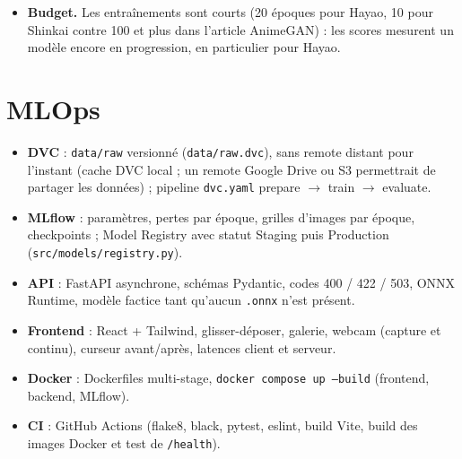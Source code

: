 \documentclass[11pt,a4paper]{article}
\begin{document}
\begin{itemize}
        baisse régulièrement (0,54 à 0,23) tandis que celle du générateur remonte légèrement :
        le discriminateur gagne la partie, signe qu'il faudrait plus d'époques ou un poids
        adverse plus fort pour que le générateur s'éloigne de la photo. Aucune divergence n'a
        été observée, ce qui est cohérent avec le rôle stabilisateur de la normalisation
        spectrale (non testée sans elle, faute de budget GPU).
  \item \textbf{Budget.} Les entraînements sont courts (20 époques pour Hayao, 10 pour
        Shinkai contre 100 et plus dans l'article AnimeGAN) : les scores mesurent un modèle
        encore en progression, en particulier pour Hayao.
\end{itemize}

\section{MLOps}
\begin{itemize}
  \item \textbf{DVC} : \texttt{data/raw} versionné (\texttt{data/raw.dvc}), sans remote
        distant pour l'instant (cache DVC local ; un remote Google Drive ou S3 permettrait de
        partager les données) ; pipeline \texttt{dvc.yaml} prepare $\rightarrow$ train
        $\rightarrow$ evaluate.
  \item \textbf{MLflow} : paramètres, pertes par époque, grilles d'images par époque,
        checkpoints ; Model Registry avec statut Staging puis Production
        (\texttt{src/models/registry.py}).
  \item \textbf{API} : FastAPI asynchrone, schémas Pydantic, codes 400 / 422 / 503, ONNX
        Runtime, modèle factice tant qu'aucun \texttt{.onnx} n'est présent.
  \item \textbf{Frontend} : React + Tailwind, glisser-déposer, galerie, webcam (capture et
        continu), curseur avant/après, latences client et serveur.
  \item \textbf{Docker} : Dockerfiles multi-stage, \texttt{docker compose up --build}
        (frontend, backend, MLflow).
  \item \textbf{CI} : GitHub Actions (flake8, black, pytest, eslint, build Vite, build des
        images Docker et test de \texttt{/health}).
\end{itemize}
\end{document}
